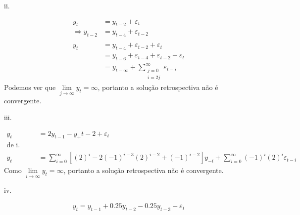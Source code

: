 \begin{enumerate}
	
	ii.
	
	\begin{align*}
		y_t&=y_{t-2}+\varepsilon_t\\
		\Rightarrow y_{t-2}&=y_{t-4}+\varepsilon_{t-2}\\
		\\
		y_t&=y_{t-4}+\varepsilon_{t-2}+\varepsilon_t\\
		&=y_{t-6}+\varepsilon_{t-4}+\varepsilon_{t-2}+\varepsilon_t\\
		&=y_{t-\infty}+\sum\limits_{\substack{j=0\\i=2j}}^{\infty}\varepsilon_{t-i}
	\end{align*}
	Podemos ver que $\lim\limits_{j\rightarrow \infty}y_t=\infty$, portanto a solução retrospectiva não é convergente.
	
	iii.
	
	\begin{align*}
		y_t&=2y_{t-1}-y_+t-2+\varepsilon_t\\
	\text{de i. podemos deduzir que}\\
		y_t&=\sum \limits_{i=0}^{\infty}[(2)^i-2(-1)^{i-3}(2)^{i-2}+(-1)^{i-2}]y_{-i}+\sum \limits_{i=0}^{\infty}(-1)^i(2)^i\varepsilon_{t-i}
	\end{align*}
	Como $\lim\limits_{i\rightarrow \infty}y_t=\infty$, portanto a solução retrospectiva não é convergente.
	
	iv.
	
	\begin{align*}
		y_t=y_{t-1}+0.25y_{t-2}-0.25y_{t-3}+\varepsilon_t
	\end{align*}
\end{enumerate}

